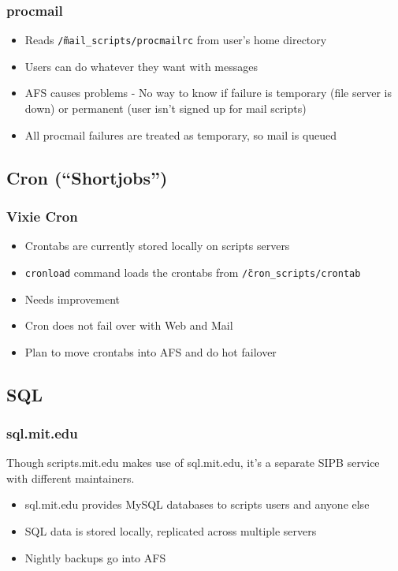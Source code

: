 \begin{frame}
  \frametitle{procmail}
  \begin{itemize}
    \item Reads {\tt \~/mail\_scripts/procmailrc} from user's home directory
    \item Users can do whatever they want with messages
    \item AFS causes problems - No way to know if failure is temporary (file server is down) or permanent (user isn't signed up for mail scripts)
    \item All procmail failures are treated as temporary, so mail is queued
  \end{itemize}
\end{frame}

\subsection{Cron (``Shortjobs'')}

\begin{frame}
  \frametitle{Vixie Cron}
  \begin{itemize}
    \item Crontabs are currently stored locally on scripts servers
    \item {\tt cronload} command loads the crontabs from {\tt \~/cron\_scripts/crontab}
      \pause
    \item Needs improvement
    \item Cron does not fail over with Web and Mail
    \item Plan to move crontabs into AFS and do hot failover
  \end{itemize}
\end{frame}

\subsection{SQL}

\begin{frame}
  \frametitle{sql.mit.edu}
  Though scripts.mit.edu makes use of sql.mit.edu, it's a separate SIPB service with different maintainers.
\begin{itemize}
\item sql.mit.edu provides MySQL databases to scripts users and anyone else
\item SQL data is stored locally, replicated across multiple servers
\item Nightly backups go into AFS
\end{itemize}
\end{frame}
